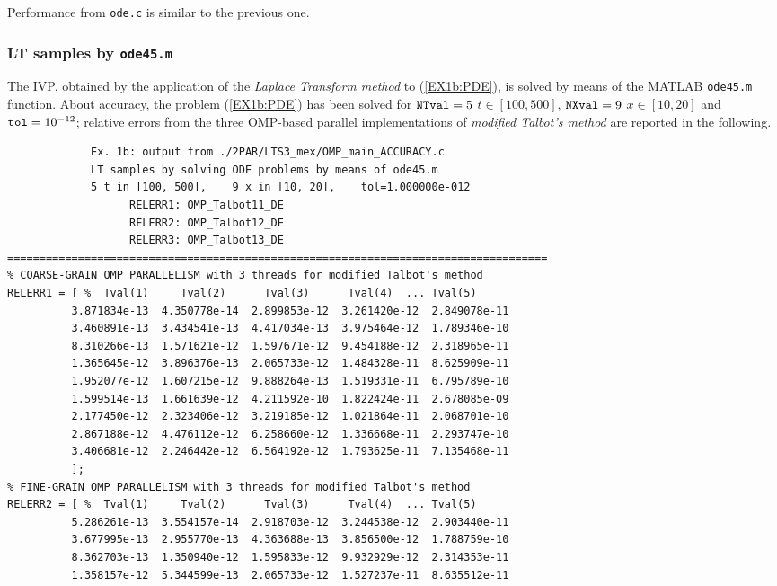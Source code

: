 \documentclass[a4paper,10pt]{report}%
\begin{document}
\noindent Performance from {\tt ode.c} is similar to the previous one.



\subsubsection{LT samples by {\tt ode45.m}}
The IVP, obtained by the application of the {\em Laplace Transform method} to (\ref{EX1b:PDE}), is solved
by means of the MATLAB {\tt ode45.m} function.
About accuracy, the problem (\ref{EX1b:PDE}) has been solved for ${\tt NTval}=5$ $t\in[100, 500]$,
${\tt NXval}=9$ $x\in[10,20]$ and ${\tt tol}=10^{-12}$; relative errors from the three OMP-based
parallel implementations of {\em modified Talbot's method} are reported in the following.
\begin{lstlisting}
             Ex. 1b: output from ./2PAR/LTS3_mex/OMP_main_ACCURACY.c
             LT samples by solving ODE problems by means of ode45.m
             5 t in [100, 500],    9 x in [10, 20],    tol=1.000000e-012
                   RELERR1: OMP_Talbot11_DE
                   RELERR2: OMP_Talbot12_DE
                   RELERR3: OMP_Talbot13_DE
====================================================================================
% COARSE-GRAIN OMP PARALLELISM with 3 threads for modified Talbot's method
RELERR1 = [ %  Tval(1)     Tval(2)      Tval(3)      Tval(4)  ... Tval(5)
          3.871834e-13  4.350778e-14  2.899853e-12  3.261420e-12  2.849078e-11
          3.460891e-13  3.434541e-13  4.417034e-13  3.975464e-12  1.789346e-10
          8.310266e-13  1.571621e-12  1.597671e-12  9.454188e-12  2.318965e-11
          1.365645e-12  3.896376e-13  2.065733e-12  1.484328e-11  8.625909e-11
          1.952077e-12  1.607215e-12  9.888264e-13  1.519331e-11  6.795789e-10
          1.599514e-13  1.661639e-12  4.211592e-10  1.822424e-11  2.678085e-09
          2.177450e-12  2.323406e-12  3.219185e-12  1.021864e-11  2.068701e-10
          2.867188e-12  4.476112e-12  6.258660e-12  1.336668e-11  2.293747e-10
          3.406681e-12  2.246442e-12  6.564192e-12  1.793625e-11  7.135468e-11
          ];
% FINE-GRAIN OMP PARALLELISM with 3 threads for modified Talbot's method
RELERR2 = [ %  Tval(1)     Tval(2)      Tval(3)      Tval(4)  ... Tval(5)
          5.286261e-13  3.554157e-14  2.918703e-12  3.244538e-12  2.903440e-11
          3.677995e-13  2.955770e-13  4.363688e-13  3.856500e-12  1.788759e-10
          8.362703e-13  1.350940e-12  1.595833e-12  9.932929e-12  2.314353e-11
          1.358157e-12  5.344599e-13  2.065733e-12  1.527237e-11  8.635512e-11

\end{lstlisting}
\end{document}
